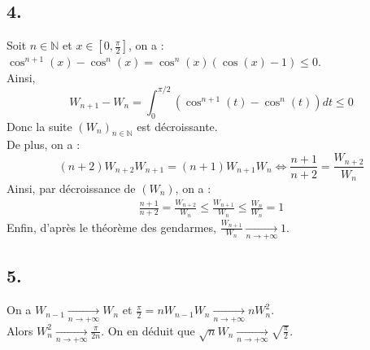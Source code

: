 \documentclass[10pt]{article}
\begin{document}
\subsection*{4.}
\begin{tcolorbox}[enhanced, width=7in, center, size=fbox, fontupper=\large, drop shadow southwest]
    Soit $n\in\mathbb{N}$ et $x\in[0,\frac{\pi}{2}]$, on a : $\cos^{n+1}(x)-\cos^n(x)=\cos^n(x)(\cos(x)-1)\leq0$.\\
    Ainsi,
    \begin{equation*}
        W_{n+1}-W_n = \int_0^{\pi/2}(\cos^{n+1}(t)-\cos^n(t))dt \leq 0
    \end{equation*}
    Donc la suite $(W_n)_{n\in\mathbb{N}}$ est décroissante.\\
    De plus, on a : 
    \begin{equation*}
        (n+2)W_{n+2}W_{n+1}=(n+1)W_{n+1}W_n \iff \frac{n+1}{n+2}=\frac{W_{n+2}}{W_n}
    \end{equation*}
    Ainsi, par décroissance de $(W_n)$, on a :
    \begin{align*}
        \frac{n+1}{n+2}=\frac{W_{n+2}}{W_n} \leq \frac{W_{n+1}}{W_n} \leq \frac{W_n}{W_n} = 1
    \end{align*}
    Enfin, d'après le théorème des gendarmes, $\frac{W_{n+1}}{W_n}\xrightarrow[n\to+\infty]{} 1$.
\end{tcolorbox}

\subsection*{5.}
\begin{tcolorbox}[enhanced, width=7in, center, size=fbox, fontupper=\large, drop shadow southwest]
    On a $W_{n-1} \xrightarrow[n\to+\infty]{}W_{n}$ et $\frac{\pi}{2}=nW_{n-1}W_n \xrightarrow[n\to+\infty]{}nW_n^2$.\\
    Alors $W_n^2 \xrightarrow[n\to+\infty]{} \frac{\pi}{2n}$. On en déduit que $\sqrt{n}W_n \xrightarrow[n\to+\infty]{}\sqrt{\frac{\pi}{2}}$.
\end{tcolorbox}
\end{document}
